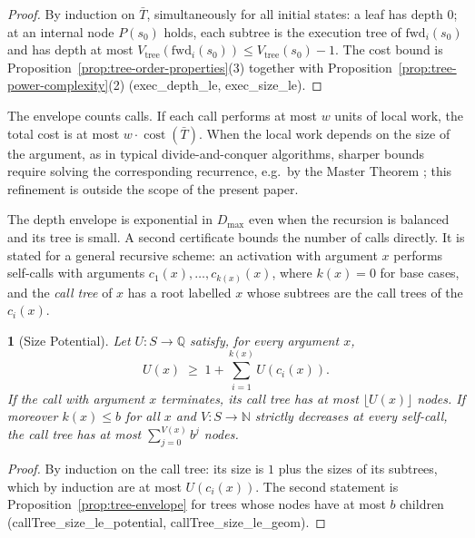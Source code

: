 \documentclass[oneside,english]{amsart}
\numberwithin{equation}{section}
\numberwithin{figure}{section}
\theoremstyle{plain}
\theoremstyle{definition}
\theoremstyle{plain}
\newtheorem{prop}[thm]{\protect\propositionname}
\theoremstyle{remark}
\theoremstyle{plain}
\theoremstyle{definition}
\theoremstyle{plain}
\theoremstyle{remark}
\DeclareMathOperator{\cost}{cost}
\newcommand{\lean}[1]{{\ttfamily\small #1}}
\providecommand{\propositionname}{Proposition}
\begin{document}
\begin{proof}
By induction on $\bar{T}$, simultaneously for all initial states: a leaf has depth $0$; at an internal node $P(s_0)$ holds, each subtree is the execution tree of $\text{fwd}_i(s_0)$ and has depth at most $V_{\text{tree}}(\text{fwd}_i(s_0)) \le V_{\text{tree}}(s_0) - 1$. The cost bound is Proposition~\ref{prop:tree-order-properties}(3) together with Proposition~\ref{prop:tree-power-complexity}(2) (\lean{exec\_\allowbreak depth\_\allowbreak le}, \lean{exec\_\allowbreak size\_\allowbreak le}).
\end{proof}

The envelope counts calls. If each call performs at most $w$ units of local work, the total cost is at most $w \cdot \cost(\bar{T})$. When the local work depends on the size of the argument, as in typical divide-and-conquer algorithms, sharper bounds require solving the corresponding recurrence, e.g.\ by the Master Theorem \cite{cormen2009introduction}; this refinement is outside the scope of the present paper.

The depth envelope is exponential in $D_{\max}$ even when the recursion is balanced and its tree is small. A second certificate bounds the number of calls directly. It is stated for a general recursive scheme: an activation with argument $x$ performs self-calls with arguments $c_1(x), \dots, c_{k(x)}(x)$, where $k(x) = 0$ for base cases, and the \textit{call tree} of $x$ has a root labelled $x$ whose subtrees are the call trees of the $c_i(x)$.

\begin{prop}[Size Potential]\label{prop:size-potential}
Let $U : S \to \mathbb{Q}$ satisfy, for every argument $x$,
\[
U(x) \;\ge\; 1 + \sum_{i=1}^{k(x)} U\left(c_i(x)\right).
\]
If the call with argument $x$ terminates, its call tree has at most $\lfloor U(x) \rfloor$ nodes. If moreover $k(x) \le b$ for all $x$ and $V : S \to \mathbb{N}$ strictly decreases at every self-call, the call tree has at most $\sum_{j=0}^{V(x)} b^j$ nodes.
\end{prop}

\begin{proof}
By induction on the call tree: its size is $1$ plus the sizes of its subtrees, which by induction are at most $U(c_i(x))$. The second statement is Proposition~\ref{prop:tree-envelope} for trees whose nodes have at most $b$ children (\lean{callTree\_\allowbreak size\_\allowbreak le\_\allowbreak potential}, \lean{callTree\_\allowbreak size\_\allowbreak le\_\allowbreak geom}).
\end{proof}
\end{document}
